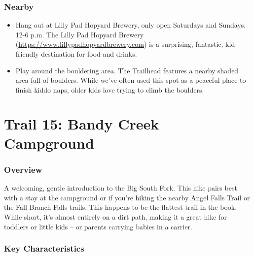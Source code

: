 \documentclass[
  letterpaper,
  DIV=11,
  numbers=noendperiod]{scrreprt}
\providecommand{\tightlist}{%
  \setlength{\itemsep}{0pt}\setlength{\parskip}{0pt}}\usepackage{longtable,booktabs,array}
\begin{document}
\subsection{Nearby}\label{nearby-13}

\begin{itemize}
\tightlist
\item
  Hang out at Lilly Pad Hopyard Brewery, only open Saturdays and
  Sundays, 12-6 p.m. The Lilly Pad Hopyard Brewery
  (\url{https://www.lillypadhopyardbrewery.com}) is a surprising,
  fantastic, kid-friendly destination for food and drinks.
\item
  Play around the bouldering area. The Trailhead features a nearby
  shaded area full of boulders. While we've often used this spot as a
  peaceful place to finish kiddo naps, older kids love trying to climb
  the boulders.
\end{itemize}

\chapter{Trail 15: Bandy Creek
Campground}\label{trail-15-bandy-creek-campground}

\subsection{Overview}\label{overview-15}

A welcoming, gentle introduction to the Big South Fork. This hike pairs
best with a stay at the campground or if you're hiking the nearby Angel
Falls Trail or the Fall Branch Falls trails. This happens to be the
flattest trail in the book. While short, it's almost entirely on a dirt
path, making it a great hike for toddlers or little kids -- or parents
carrying babies in a carrier.

\subsection{Key Characteristics}\label{key-characteristics-14}
\end{document}
